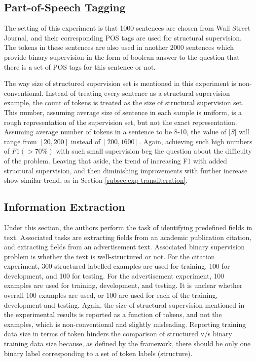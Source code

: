 \documentclass{acm_proc_article-sp}
\begin{document}
\subsection{Part-of-Speech Tagging}
\label{subsec:exp-pos-tagging}
The setting of this experiment is that 1000 sentences are chosen from Wall Street Journal, and their corresponding POS tags are used for structural supervision. The tokens in these sentences are also used in another 2000 sentences which provide binary supervision in the form of boolean answer to the question that there is a set of POS tags for this sentence or not.

The way size of structured supervision set is mentioned in this experiment is non-conventional. Instead of treating every sentence as a structural supervision example, the count of tokens is treated as the size of structural supervision set. This number, assuming average size of sentence in each sample is uniform, is a rough representation of the supervision set, but not the exact representation. Assuming average number of tokens in a sentence to be 8-10, the value of $|S|$ will range from $[20,200]$ instead of $[200,1600]$. Again, achieving such high numbers of $F1 (> 70\%)$ with such small supervision beg the question about the difficulty of the problem. Leaving that aside, the trend of increasing F1 with added structural supervision, and then diminishing improvements with further increase show similar trend, as in Section \ref{subsec:exp-transliteration}.


\subsection{Information Extraction}
\label{subsec:exp-info-ext}
Under this section, the authors perform the task of identifying predefined fields in text. Associated tasks are extracting fields from an academic publication citation, and extracting fields from an advertisement text. Associated binary supervision problem is whether the text is well-structured or not. For the citation experiment, 300 structured labelled examples are used for training, 100 for development, and 100 for testing. For the advertisement experiment, 100 examples are used for training, development, and testing. It is unclear whether overall 100 examples are used, or 100 are used for each of the training, development and testing. Again, the size of structural supervision mentioned in the experimental results is reported as a function of tokens, and not the examples, which is non-conventional and slightly misleading. Reporting training data size in terms of token hinders the comparison of structured v/s binary training data size because, as defined by the framework, there should be only one binary label corresponding to a set of token labels (structure).
\end{document}
